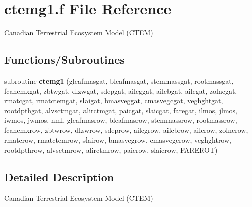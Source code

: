 \hypertarget{ctemg1_8f}{}\section{ctemg1.\+f File Reference}
\label{ctemg1_8f}


Canadian Terrestrial Ecosystem Model (C\+T\+E\+M)  


\subsection*{Functions/\+Subroutines}
\begin{DoxyCompactItemize}
\item 
\hypertarget{ctemg1_8f_a62bd1620304a727ac3a54df8f33d8e0d}{}subroutine {\bfseries ctemg1} (gleafmasgat, bleafmasgat, stemmassgat, rootmassgat, fcancmxgat, zbtwgat, dlzwgat, sdepgat, ailcggat, ailcbgat, ailcgat, zolncgat, rmatcgat, rmatctemgat, slaigat, bmasveggat, cmasvegcgat, veghghtgat, rootdpthgat, alvsctmgat, alirctmgat, paicgat, slaicgat, faregat, ilmos, jlmos, iwmos, jwmos, nml, gleafmasrow, bleafmasrow, stemmassrow, rootmassrow, fcancmxrow, zbtwrow, dlzwrow, sdeprow, ailcgrow, ailcbrow, ailcrow, zolncrow, rmatcrow, rmatctemrow, slairow, bmasvegrow, cmasvegcrow, veghghtrow, rootdpthrow, alvsctmrow, alirctmrow, paicrow, slaicrow, F\+A\+R\+E\+R\+O\+T)\label{ctemg1_8f_a62bd1620304a727ac3a54df8f33d8e0d}

\end{DoxyCompactItemize}


\subsection{Detailed Description}
Canadian Terrestrial Ecosystem Model (C\+T\+E\+M) 

